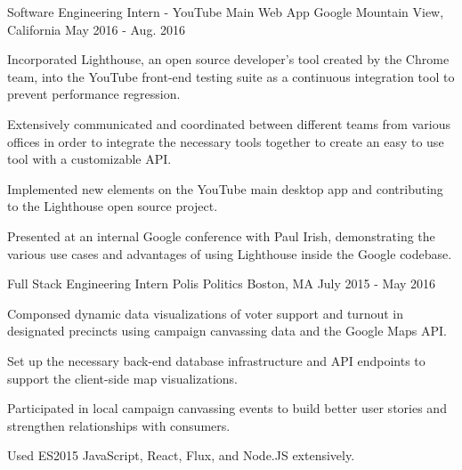 


\begin{cventries}


\cventry
{Software Engineering Intern - YouTube Main Web App} %
{Google} %
{Mountain View, California} %
{May 2016 - Aug. 2016} %
{ %
\begin{cvitems}
\item {Incorporated Lighthouse, an open
source developer's tool created by the Chrome team, into the YouTube front-end
testing suite as a continuous integration tool to prevent performance
regression.}
\item {Extensively communicated and coordinated between
different teams from various offices in order to integrate the necessary tools
together to create an easy to use tool with a customizable API.}
\item {Implemented new elements on the YouTube main desktop app
and contributing to the Lighthouse open source project.}
\item {Presented at an internal Google conference with Paul Irish, demonstrating the various use
cases and advantages of using Lighthouse inside the Google codebase.}
\end{cvitems}
}


\cventry
{Full Stack Engineering Intern} %
{Polis Politics} %
{Boston, MA} %
{July 2015 - May 2016} %
{ %
\begin{cvitems}
\item{Componsed dynamic data visualizations of voter support and turnout in
designated precincts using campaign canvassing data and the Google Maps API.}
\item {Set up the necessary back-end database infrastructure and API endpoints
to support the client-side map visualizations.}
\item {Participated in local campaign canvassing events to build better user
stories and strengthen relationships with consumers.}
\item {Used ES2015 JavaScript, React, Flux, and Node.JS extensively.}
\end{cvitems}
}


\end{cventries}
